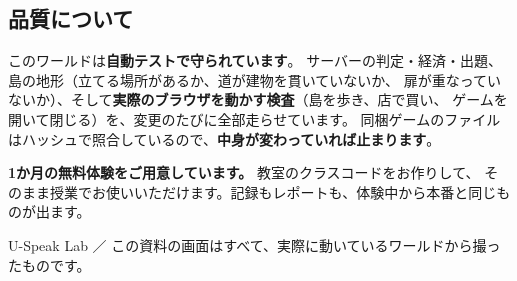 \documentclass[a4paper,10.5pt]{article}
\begin{document}
\subsection{品質について}

このワールドは\textbf{自動テストで守られています}。
サーバーの判定・経済・出題、島の地形（立てる場所があるか、道が建物を貫いていないか、
扉が重なっていないか）、そして\textbf{実際のブラウザを動かす検査}（島を歩き、店で買い、
ゲームを開いて閉じる）を、変更のたびに全部走らせています。
同梱ゲームのファイルはハッシュで照合しているので、\textbf{中身が変わっていれば止まります}。

\vspace{10pt}
\begin{notebox}
\textbf{1か月の無料体験をご用意しています。} 教室のクラスコードをお作りして、
そのまま授業でお使いいただけます。記録もレポートも、体験中から本番と同じものが出ます。
\end{notebox}

\vspace{14pt}
\begin{center}
\color{uspeakGreen}\small
U-Speak Lab ／ この資料の画面はすべて、実際に動いているワールドから撮ったものです。
\end{center}
\end{document}

